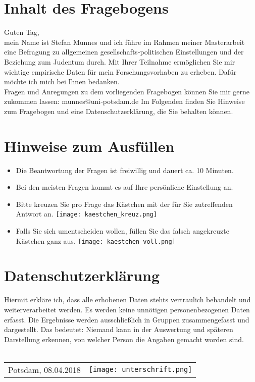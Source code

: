 \documentclass[12 pt,german,a4paper]{article}
\begin{document}
\pagestyle{empty}

\section*{Inhalt des Fragebogens}

\noindent
Guten Tag, \\
mein Name ist Stefan Munnes und ich führe im Rahmen meiner Masterarbeit eine Befragung zu allgemeinen gesellschafts-politischen Einstellungen und der Beziehung zum Judentum durch. Mit Ihrer Teilnahme ermöglichen Sie mir wichtige empirische Daten für mein Forschungsvorhaben zu erheben. Dafür möchte ich mich bei Ihnen bedanken. \\
Fragen und Anregungen zu dem vorliegenden Fragebogen können Sie mir gerne zukommen lassen: munnes$@$uni-potsdam.de \newline \newline
Im Folgenden finden Sie Hinweise zum Fragebogen und eine Datenschutzerklärung, die Sie behalten können.



\section*{Hinweise zum Ausfüllen}
\begin{itemize}
\item Die Beantwortung der Fragen ist freiwillig und dauert ca. 10 Minuten.
\item Bei den meisten Fragen kommt es auf Ihre persönliche Einstellung an.
\item Bitte kreuzen Sie pro Frage das Kästchen mit der für Sie zutreffenden Antwort an. \texttt{[image: kaestchen\_kreuz.png]}
\item Falls Sie sich umentscheiden wollen, füllen Sie das falsch angekreuzte Kästchen ganz aus. \texttt{[image: kaestchen\_voll.png]}
\end{itemize}


\section*{Datenschutzerklärung}
Hiermit erkläre ich, dass alle erhobenen Daten stehts vertraulich behandelt und weiterverarbeitet werden. Es werden keine unnötigen personenbezogenen Daten erfasst. Die Ergebnisse werden ausschließlich in Gruppen zusammengefasst und dargestellt. Das bedeutet: Niemand kann in der Auswertung und späteren Darstellung erkennen, von welcher Person die Angaben gemacht worden sind.
\\
\vspace{1cm}
\\
\begin{tabular}{p{8cm} m{5cm}}
Potsdam, 08.04.2018 & \texttt{[image: unterschrift.png]}
\end{tabular} 
\end{document}

